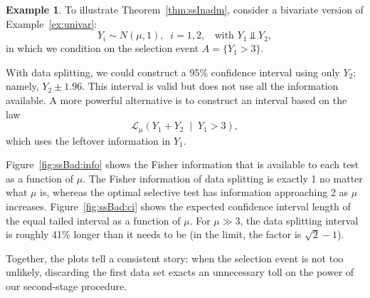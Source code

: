 \documentclass{article}
\theoremstyle{definition}
\newtheorem{example}{Example}
\newcommand{\Gv}{\;\;\big|\;\;}
\newcommand{\cL}{\mathcal{L}}
\newcommand{\sampOrData}{data }
\begin{document}
\begin{example}\label{ex:ssBad}
To illustrate Theorem~\ref{thm:ssInadm}, consider a bivariate version of Example~\ref{ex:univar}:
\begin{equation}
  Y_{i} \sim N(\mu,1),\;\; i=1,2, \;\;\text{ with } Y_{1} \Perp Y_{2},
\end{equation}
in which we condition on the selection event $A=\{Y_{1} > 3\}$.

With \sampOrData splitting, we could construct a 95\% confidence interval using only $Y_{2}$; namely, ${Y_{2} \pm 1.96}$. This interval is valid but does not use all the information available.
A more powerful alternative is to construct an interval based on the law
\begin{equation}
  \cL_{\mu}\left( Y_{1} + Y_{2} \Gv Y_{1} > 3\right),
\end{equation}
which uses the leftover information in $Y_{1}$.

Figure~\ref{fig:ssBad:info} shows the Fisher information that is available to each test as a function of $\mu$. The Fisher information of \sampOrData splitting is exactly 1 no matter what $\mu$ is, whereas the optimal selective test has information approaching 2 as $\mu$ increases. Figure~\ref{fig:ssBad:ci} shows the expected confidence interval length of the equal tailed interval as a function of $\mu$. For $\mu\gg 3$, the \sampOrData splitting interval is roughly 41\% longer than it needs to be (in the limit, the factor is $\sqrt{2}-1$).

Together, the plots tell a consistent story: when the selection event is not too unlikely, discarding the first data set exacts an unnecessary toll on the power of our second-stage procedure.
\end{example}
\end{document}
